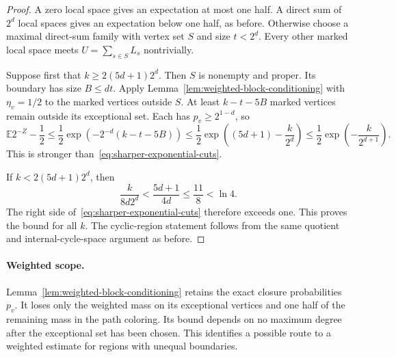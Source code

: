 \begin{proof}
A zero local space gives an expectation at most one half.
A direct sum of $2^d$ local spaces gives an expectation below one half, as before.
Otherwise choose a maximal direct-sum family with vertex set $S$ and size $t<2^d$.
Every other marked local space meets $U=\sum_{s\in S}L_s$ nontrivially.

Suppose first that $k\ge2(5d+1)2^d$.
Then $S$ is nonempty and proper.
Its boundary has size $B\le dt$.
Apply Lemma~\ref{lem:weighted-block-conditioning} with $\eta_v=1/2$ to the marked vertices outside $S$.
At least $k-t-5B$ marked vertices remain outside its exceptional set.
Each has $p_v\ge2^{1-d}$, so
\[
 \mathbb E2^{-Z}-\frac12
 \le\frac12\exp\!\left(-2^{-d}(k-t-5B)\right)
 \le\frac12\exp\!\left((5d+1)-\frac{k}{2^d}\right)
 \le\frac12\exp\!\left(-\frac{k}{2^{d+1}}\right).
\]
This is stronger than~\eqref{eq:sharper-exponential-cuts}.

If $k<2(5d+1)2^d$, then
\[
 \frac{k}{8d2^d}<\frac{5d+1}{4d}\le\frac{11}{8}<\ln4.
\]
The right side of~\eqref{eq:sharper-exponential-cuts} therefore exceeds one.
This proves the bound for all $k$.
The cyclic-region statement follows from the same quotient and internal-cycle-space argument as before.
\end{proof}

\paragraph{Weighted scope.}
Lemma~\ref{lem:weighted-block-conditioning} retains the exact closure probabilities $p_v$.
It loses only the weighted mass on its exceptional vertices and one half of the remaining mass in the path coloring.
Its bound depends on no maximum degree after the exceptional set has been chosen.
This identifies a possible route to a weighted estimate for regions with unequal boundaries.
